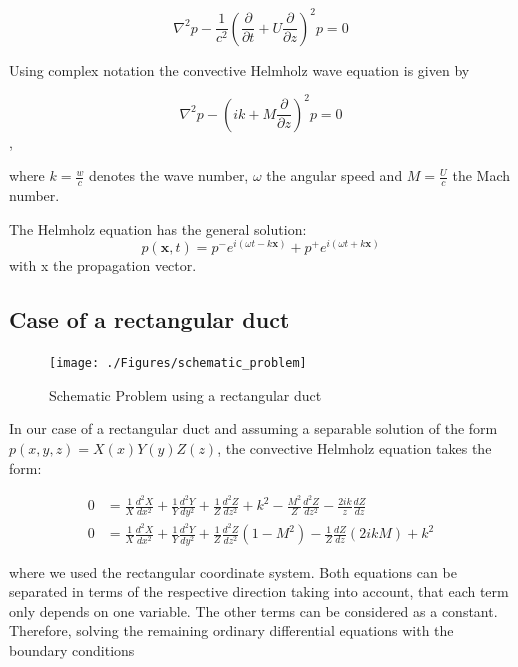 \documentclass[11pt]{report} %
\begin{document}
\begin{equation}
    \nabla ^2p-\frac{1}{c^2} \left( \frac{\partial}{\partial t}+U\frac{\partial}{\partial z} \right)^2p  = 0
\end{equation}   

Using complex notation the convective Helmholz wave equation is given by 

\begin{equation}
\nabla^2 p - \left(ik +M\frac{\partial}{\partial z}\right)^2p = 0
\end{equation},  

where $k=\frac{w}{c}$ denotes the wave number, $\omega$ the angular speed and $M=\frac{U}{c}$ the Mach number. 

The Helmholz equation has the general solution:
\begin{equation}
p(\textbf{x},t)=p^{-}e^{i(\omega t-k\textbf{x})}+p^{+}e^{i(\omega t+k\textbf{x})}
\end{equation}
with x the propagation vector. 

\subsection{Case of a rectangular duct}
\begin{figure}[H]
\centering
\texttt{[image: ./Figures/schematic\_problem]}
\caption{Schematic Problem using a rectangular duct}
\end{figure}
In our case of a rectangular duct and assuming a separable solution of the form  $p(x,y,z) = X(x)Y(y)Z(z)$, the convective Helmholz equation takes the form: 

\begin{subequations}
\begin{align}
0&=\frac{1}{X} \frac{d^2X}{dx^2}+\frac{1}{Y} \frac{d^2Y}{dy^2}+\frac{1}{Z} \frac{d^2Z}{dz^2} +k^2 -\frac{M^2}{Z}\frac{d^2Z}{dz^2}-\frac{2ik}{z} \frac{dZ}{dz}\\
0&=\frac{1}{X} \frac{d^2X}{dx^2}+\frac{1}{Y} \frac{d^2Y}{dy^2}+\frac{1}{Z} \frac{d^2Z}{dz^2}(1-M^2) -\frac{1}{Z}\frac{dZ}{dz}(2ikM)+k^2 	
\end{align}
\end{subequations}

where we used the rectangular coordinate system. 
Both equations can be separated in terms of the respective direction taking into account, that each term only depends on one variable. 
The other terms can be considered as a constant. 
Therefore,  solving the remaining ordinary differential equations with the boundary conditions
\end{document}
